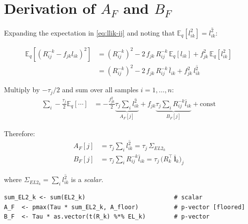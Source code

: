 \documentclass[11pt]{article}
\newcommand{\lbar}[2]{\bar{l}_{#1#2}}
\newcommand{\lsec}[2]{\overline{l^2_{#1#2}}}
\newcommand{\Rk}[0]{R^{-k}}
\begin{document}
\section{Derivation of $A_F$ and $B_F$}\label{sec:derivation}

\begin{derivbox}
Expanding the expectation in \eqref{eq:llik-ij} and noting that
$\mathbb{E}_q[l_{ik}^2] = \lsec{i}{k}$:

\begin{align*}
  \mathbb{E}_q\!\left[(\Rk_{ij} - f_{jk}l_{ik})^2\right]
  &= (\Rk_{ij})^2 - 2\,f_{jk}\,\Rk_{ij}\,\mathbb{E}_q[l_{ik}]
     + f_{jk}^2\,\mathbb{E}_q[l_{ik}^2] \\
  &= (\Rk_{ij})^2 - 2\,f_{jk}\,\Rk_{ij}\,\lbar{i}{k}
     + f_{jk}^2\,\lsec{i}{k}
\end{align*}

Multiply by $-\tau_j/2$ and sum over all samples $i = 1,\ldots,n$:
\begin{align}
  \sum_i -\frac{\tau_j}{2}\mathbb{E}_q[\cdots]
  &= -\frac{f_{jk}^2}{2}
       \underbrace{\tau_j\sum_i\lsec{i}{k}}_{A_F[j]}
     + f_{jk}
       \underbrace{\tau_j\sum_i\Rk_{ij}\lbar{i}{k}}_{B_F[j]}
     + \text{const}
  \label{eq:AF-BF}
\end{align}
\end{derivbox}

Therefore:
\begin{align}
  A_F[j] &= \tau_j \sum_i \lsec{i}{k} = \tau_j\,\Sigma_{EL2_k}
  \label{eq:AF} \\[4pt]
  B_F[j] &= \tau_j \sum_i \Rk_{ij}\lbar{i}{k}
           = \tau_j\,\bigl(R_k^\top\,\bar{\bm{l}}_k\bigr)_j
  \label{eq:BF}
\end{align}

where $\Sigma_{EL2_k} = \sum_i\lsec{i}{k}$ is a \emph{scalar}.

\begin{codebox}
\begin{verbatim}
sum_EL2_k <- sum(EL2_k)                         # scalar
A_F  <- pmax(Tau * sum_EL2_k, A_floor)          # p-vector [floored]
B_F  <- Tau * as.vector(t(R_k) %*% EL_k)        # p-vector
\end{verbatim}
\end{codebox}

\end{document}
